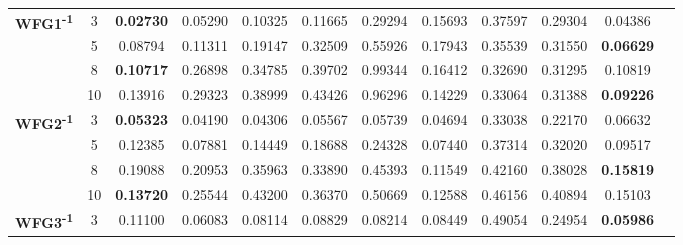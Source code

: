 \documentclass{sig-alternate}
\begin{document}
\begin{table*}[!htb]
\begin{tabular}{|c|c|c|c|c|c|c|c|c|c|c|c|}
\multirow{4}{*}{\textbf{WFG1\textsuperscript{-1}}}  & 3          & \textbf{0.02730} & 0.05290           & 0.10325               & 0.11665          & 0.29294             & 0.15693             & 0.37597            & 0.29304              & 0.04386          \\ \cline{2-11} 
                                                      & 5          & 0.08794          & 0.11311           & 0.19147               & 0.32509          & 0.55926             & 0.17943             & 0.35539            & 0.31550              & \textbf{0.06629} \\ \cline{2-11} 
                                                      & 8          & \textbf{0.10717} & 0.26898           & 0.34785               & 0.39702          & 0.99344             & 0.16412             & 0.32690            & 0.31295              & 0.10819          \\ \cline{2-11} 
                                                      & 10         & 0.13916          & 0.29323           & 0.38999               & 0.43426          & 0.96296             & 0.14229             & 0.33064            & 0.31388              & \textbf{0.09226} \\ \hline
\multirow{4}{*}{\textbf{WFG2\textsuperscript{-1}}}  & 3          & \textbf{0.05323} & 0.04190           & 0.04306               & 0.05567          & 0.05739             & 0.04694             & 0.33038            & 0.22170              & 0.06632          \\ \cline{2-11} 
                                                      & 5          & 0.12385          & 0.07881           & 0.14449               & 0.18688          & 0.24328             & 0.07440             & 0.37314            & 0.32020              & 0.09517          \\ \cline{2-11} 
                                                      & 8          & 0.19088          & 0.20953           & 0.35963               & 0.33890          & 0.45393             & 0.11549             & 0.42160            & 0.38028              & \textbf{0.15819} \\ \cline{2-11} 
                                                      & 10         & \textbf{0.13720} & 0.25544           & 0.43200               & 0.36370          & 0.50669             & 0.12588             & 0.46156            & 0.40894              & 0.15103          \\ \hline
\multirow{4}{*}{\textbf{WFG3\textsuperscript{-1}}}  & 3          & 0.11100          & 0.06083           & 0.08114               & 0.08829          & 0.08214             & 0.08449             & 0.49054            & 0.24954              & \textbf{0.05986} \\ \cline{2-11} 

\end{tabular}
\end{table*}
\end{document}
